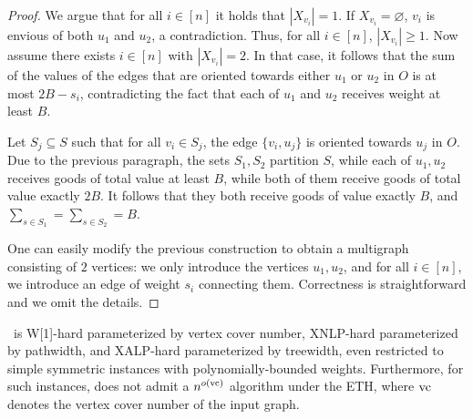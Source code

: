 \begin{proof}
    We argue that for all $i \in [n]$ it holds that $|X_{v_i}| = 1$.
    If $X_{v_i} = \varnothing$, $v_i$ is envious of both $u_1$ and $u_2$, a contradiction.
    Thus, for all $i \in [n]$, $|X_{v_i}| \ge 1$.
    Now assume there exists $i \in [n]$ with $|X_{v_i}| = 2$.
    In that case, it follows that the sum of the values of the edges that are oriented
    towards either $u_1$ or $u_2$ in $O$ is at most $2B - s_i$, contradicting the fact that each of $u_1$ and $u_2$ receives weight at least $B$.

    Let $S_j \subseteq S$ such that for all $v_i \in S_j$, the edge $\{ v_i, u_j \}$ is oriented towards $u_j$ in $O$.
    Due to the previous paragraph, the sets $S_1,S_2$ partition $S$, while each of $u_1,u_2$ receives goods of total value at least $B$,
    while both of them receive goods of total value exactly $2B$.
    It follows that they both receive goods of value exactly $B$, and $\sum_{s \in S_1} = \sum_{s \in S_2} = B$.

    One can easily modify the previous construction to obtain a multigraph consisting of $2$ vertices:
    we only introduce the vertices $u_1,u_2$, and for all $i \in [n]$, we introduce an edge of weight $s_i$ connecting them.
    Correctness is straightforward and we omit the details.
\end{proof}

\begin{theoremrep}[\appsymb]\label{thm:EF:w1h}
    \EFo\ is W[1]-hard parameterized by vertex cover number,
    XNLP-hard parameterized by pathwidth,
    and XALP-hard parameterized by treewidth,
    even restricted to simple symmetric instances with polynomially-bounded weights.
    Furthermore, for such instances, {\EFo} does not admit a $n^{o(\mathrm{vc})}$ algorithm under the ETH,
    where $\mathrm{vc}$ denotes the vertex cover number of the input graph.
\end{theoremrep}


